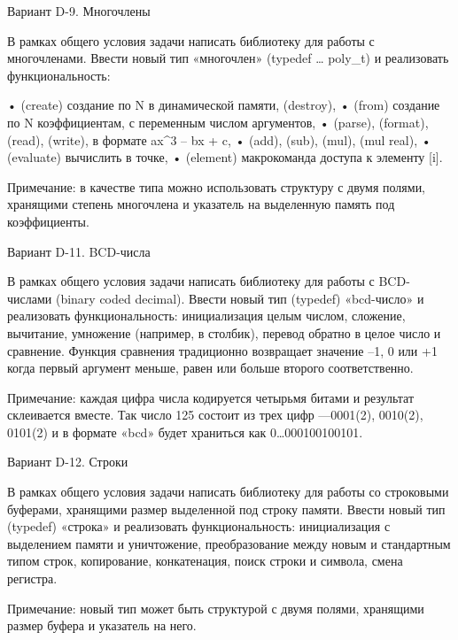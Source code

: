 
Вариант D-9. Многочлены

В рамках общего условия задачи написать библиотеку для работы с многочленами.
Ввести новый тип «многочлен» (typedef … poly_t) и реализовать
функциональность:

•	(create) создание по N в динамической памяти, (destroy),
•	(from) создание по N коэффициентам, с переменным числом аргументов,
•	(parse), (format), (read), (write), в формате ax^3 – bx + c,
•	(add), (sub), (mul), (mul real),
•	(evaluate) вычислить в точке,
•	(element) макрокоманда доступа к элементу [i].

Примечание: в качестве типа можно использовать структуру с двумя полями,
хранящими степень многочлена и указатель на выделенную память под
коэффициенты.


Вариант D-11. BCD-числа

В рамках общего условия задачи написать библиотеку для работы с BCD-числами
(binary coded decimal). Ввести новый тип (typedef) «bcd-число» и реализовать
функциональность: инициализация целым числом, сложение, вычитание, умножение
(например, в столбик), перевод обратно в целое число и сравнение. Функция
сравнения традиционно возвращает значение –1, 0 или +1 когда первый аргумент
меньше, равен или больше второго соответственно.

Примечание: каждая цифра числа кодируется четырьмя битами и результат
склеивается вместе. Так число 125 состоит из трех цифр —0001(2), 0010(2),
0101(2) и в формате «bcd» будет храниться как 0…000100100101.


Вариант D-12. Строки

В рамках общего условия задачи написать библиотеку для работы со строковыми
буферами, хранящими размер выделенной под строку памяти. Ввести новый тип
(typedef) «строка» и реализовать функциональность: инициализация с выделением
памяти и уничтожение, преобразование между новым и стандартным типом строк,
копирование, конкатенация, поиск строки и символа, смена регистра.

Примечание: новый тип может быть структурой с двумя полями, хранящими размер
буфера и указатель на него.
